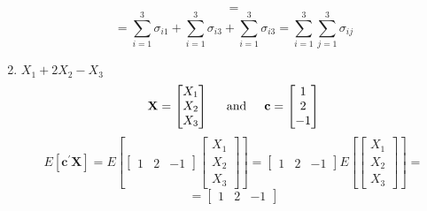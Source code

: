 \begin{enumerate}[label=(\alph*)]
\[                =
            \]
            \[
                =
                \sum_{i=1}^3{\sigma_{i1}} + \sum_{i=1}^3{\sigma_{i3}} + \sum_{i=1}^3{\sigma_{i3}}
                =
                \sum_{i=1}^3{\sum_{j=1}^3{\sigma_{ij}}}
            \]
            \item $X_1 + 2X_2 - X_3$
            \[
                \textbf{X}
                =
                \begin{bmatrix}
                    X_1 \\
                    X_2 \\
                    X_3
                \end{bmatrix}
                \hspace{0.2in}\text{and}\hspace{0.2in}
                \textbf{c}
                =
                \begin{bmatrix}
                    1 \\
                    2 \\
                    -1
                \end{bmatrix}
            \]
            \[
                E\left[\textbf{c}^\prime\textbf{X}\right]
                =
                E\left[
                \begin{bmatrix}
                    1 & 2 & -1
                \end{bmatrix}
                    \begin{bmatrix}
                    X_1 \\
                    X_2 \\
                    X_3
                \end{bmatrix}
                \right]
                =
                \begin{bmatrix}
                    1 & 2 & -1
                \end{bmatrix}                
                E\left[
                \begin{bmatrix}
                    X_1 \\
                    X_2 \\
                    X_3
                \end{bmatrix}
                \right]
                =
            \]
            \[
                =
                \begin{bmatrix}
                    1 & 2 & -1
                \end{bmatrix}                
\]
\end{enumerate}
